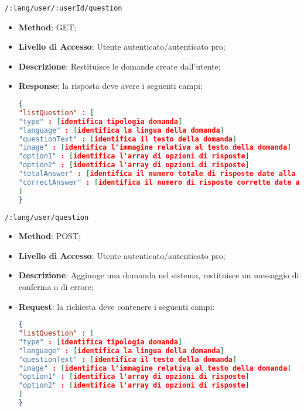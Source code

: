 \item \texttt{/:lang/user/:userId/question}
	\begin{itemize}
		\item \textbf{Method}: GET;
		\item \textbf{Livello di Accesso}: Utente autenticato/autenticato pro;
		\item \textbf{Descrizione}: Restituisce le domande create dall'utente;
		\item \textbf{Response}: la risposta deve avere i seguenti campi:
\begin{lstlisting}[language=json,firstnumber=1]
{
"listQuestion" : [ 
"type" : [identifica tipologia domanda]
"language" : [identifica la lingua della domanda]
"questionText" : [identifica il testo della domanda]
"image" : [identifica l'immagine relativa al testo della domanda]
"option1" : [identifica l'array di opzioni di risposte]
"option2" : [identifica l'array di opzioni di risposte]
"totalAnswer" : [identifica il numero totale di risposte date alla domanda]
"correctAnswer" : [identifica il numero di risposte corrette date alla domanda]
]
}
\end{lstlisting}
	\end{itemize}	
	
	
	\item \texttt{/:lang/user/question}
		\begin{itemize}
			\item \textbf{Method}: POST;
			\item \textbf{Livello di Accesso}: Utente autenticato/autenticato pro;
			\item \textbf{Descrizione}: Aggiunge una domanda nel sistema, restituisce un messaggio di conferma o di errore;
			\item \textbf{Request}: la richiesta deve contenere i seguenti campi:
\begin{lstlisting}[language=json,firstnumber=1]
{
"listQuestion" : [ 
"type" : [identifica tipologia domanda]
"language" : [identifica la lingua della domanda]
"questionText" : [identifica il testo della domanda]
"image" : [identifica l'immagine relativa al testo della domanda]
"option1" : [identifica l'array di opzioni di risposte]
"option2" : [identifica l'array di opzioni di risposte]
]
}
\end{lstlisting}
		\end{itemize}